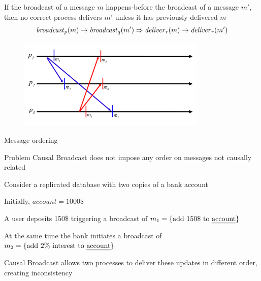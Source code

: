 \begin{frame}

\begin{definition}
If the broadcast of a message $m$ \alert{happens-before} the broadcast of a message $m'$, then 
no correct process delivers $m'$ unless it has previously delivered $m$
\[
  \mathit{broadcast}_p(m) \rightarrow \mathit{broadcast}_q(m') \Rightarrow \mathit{deliver}_r(m) \rightarrow \mathit{deliver}_r(m')
\]
\end{definition}

 

\begin{figure}
\includegraphics[width=0.8\textwidth]{rb-causal1}
\end{figure}
		
\end{frame}

\begin{frame}{Message ordering}
\begin{block}{Problem}
Causal Broadcast does not impose any order on messages not causally related
\end{block}
\begin{example}
\BI
\item Consider a replicated database with two copies of a bank account
\item Initially, $\mathit{account} = 1000\$$
\item A user deposits 150\$ triggering a broadcast of $m_1 = \{ \textrm{add 150\$ to \emph{account}} \}$  
\item At the same time the bank initiates a broadcast of $m_2 = \{ \textrm{add 2\% interest to \emph{account}} \}$
\item Causal Broadcast allows two processes to deliver these updates in different order, creating inconsistency
\EI
\end{example}
\end{frame}


